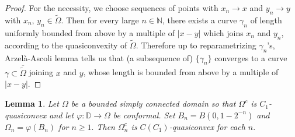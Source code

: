 \documentclass[reqno,11pt]{amsart}
\makeatletter
\def\wz{\widetilde}
\newtheorem{lem}[thm]{Lemma}%
\numberwithin{equation}{section}
\theoremstyle{remark}
\makeatother
\begin{document}
\begin{proof}
For the necessity, we choose sequences of points with $x_n\to x$ and $y_n\to y$ with  $x_n,\,y_n\in \wz \Omega$. Then for every large $n\in \mathbb N$, there exists a curve $\gamma_n$ of length  uniformly bounded  from above by a multiple of $|x-y|$ which joins $x_n$ and $y_n$, according to the quasiconvexity of $\wz \Omega$. Therefore up to reparametrizing $\gamma_n$'s, Arzel\`a-Ascoli lemma tells us that (a subsequence of) $\{\gamma_n\}$ converges to a curve $\gamma\subset \overline{\wz \Omega}$ joining $x$ and $y$, whose length is bounded from above by a multiple of $|x-y|$. 
\end{proof}


\begin{lem} \label{inherited} Let $\Omega$ be a bounded simply connected 
domain so that $\Omega^c$ is $C_1$-quasiconvex and let $\varphi\colon \mathbb D\to \Omega$
be conformal. Set $B_n=B(0,1-2^{-n})$ and $\Omega_n=\varphi(B_n)$ for $n\ge 1.$
Then $\Omega_n^c$ is $C(C_1)$-quasiconvex for each $n.$
\end{lem}
\end{document}
